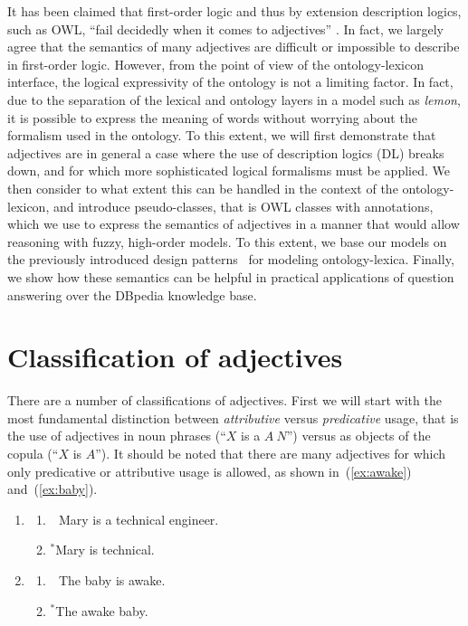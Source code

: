 \documentclass[11pt]{article}
\begin{document}
It has been claimed that first-order logic and thus by extension description 
logics, such as OWL, ``fail decidedly when it comes to adjectives''
\cite{bankston2003modeling}. In fact, we largely agree that the semantics 
of many adjectives are difficult or impossible to describe in first-order logic. 
However, from the point of view of the ontology-lexicon interface, the logical 
expressivity of the ontology is not a limiting factor. In fact, due to the 
separation of the lexical and ontology layers in a model such as \emph{lemon}, 
it is possible to express the meaning of words without worrying about the 
formalism used in the ontology. To this extent, we will first demonstrate that 
adjectives are in general a case where the use of description logics (DL) breaks down, 
and for which more sophisticated logical formalisms must be applied. We then 
consider to what extent this can be handled in the context of the 
ontology-lexicon, and introduce pseudo-classes, that is OWL classes with 
annotations, which we use to express the semantics of adjectives in a manner
that would allow reasoning with fuzzy, high-order models. To this extent, we base
our models on the previously introduced design patterns~\cite{mccrae2014design}
for modeling ontology-lexica. 
Finally, we show how these semantics can be helpful in practical applications 
of question answering over the DBpedia knowledge base.

\section{Classification of adjectives}

There are a number of classifications of adjectives. First we will start 
with the most fundamental distinction between \emph{attributive} versus 
\emph{predicative} usage, that is the use of adjectives in noun phrases 
(``$X$ is a $A~N$'') versus as objects of the copula (``$X$ is $A$''). 
It should be noted that there are many adjectives for which only predicative or 
attributive usage is allowed, as shown in~(\ref{ex:awake}) and~(\ref{ex:baby}).

\begin{enumerate}
\item \begin{enumerate}	
\item \ \,Mary is a technical engineer. \label{ex:engineer}
\item $^\ast$Mary is technical.
\end{enumerate}
\label{ex:technical}
\item \begin{enumerate}	
        \item \ \,The baby is awake. \label{ex:awake}
\item $^\ast$The awake baby.
\end{enumerate}
\label{ex:baby}
\end{enumerate}
\end{document}
